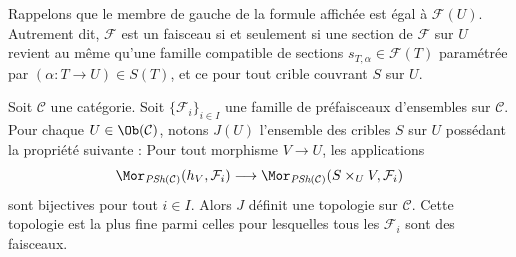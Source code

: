 \noindent
Rappelons que le membre de gauche de la formule
affichée est égal à $\mathcal{F}(U)$. Autrement dit, $\mathcal{F}$
est un faisceau si et seulement si une section de $\mathcal{F}$
sur $U$ revient au même qu'une famille compatible de sections
$s_{T, \alpha} \in \mathcal{F}(T)$ paramétrée par
$(\alpha : T \to U) \in S(T)$, et ce pour tout crible couvrant $S$
sur $U$.

\begin{lemma}
\label{lemma-topology-presheaves-sheaves}
Soit $\mathcal{C}$ une catégorie. Soit $\{ \mathcal{F}_i \}_{i\in I}$ une
famille de préfaisceaux d'ensembles sur $\mathcal{C}$. Pour chaque
$U \in \Ob(\mathcal{C})$, notons
$J(U)$ l'ensemble des cribles $S$ sur $U$ possédant la propriété suivante :
Pour tout morphisme $V \to U$, les applications
$$
\Mor_{\textit{PSh}(\mathcal{C})}(h_V, \mathcal{F}_i)
\longrightarrow
\Mor_{\textit{PSh}(\mathcal{C})}(S \times_U V, \mathcal{F}_i)
$$
sont bijectives pour tout $i \in I$. Alors $J$ définit une
topologie sur $\mathcal{C}$. Cette topologie est la plus fine
parmi celles pour lesquelles tous les $\mathcal{F}_i$ sont des faisceaux.
\end{lemma}

